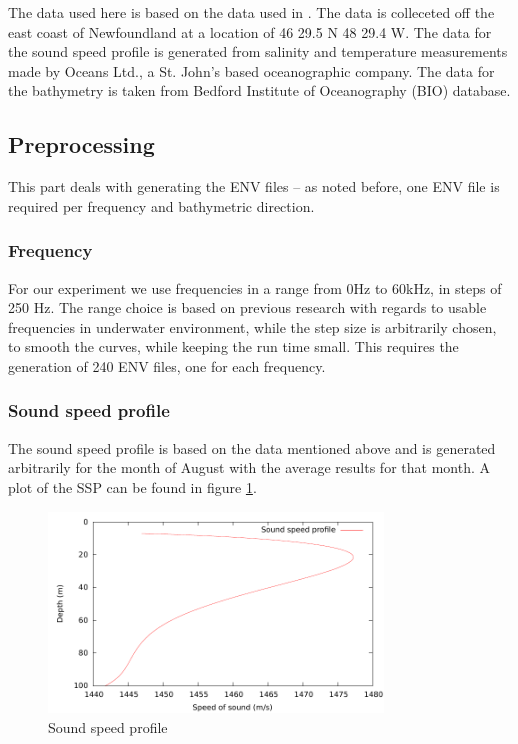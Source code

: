 \documentclass[a4paper]{IEEEtran}
\begin{document}
The data used here is based on the data used in \cite{book}. The data
is colleceted off the east coast of Newfoundland at a location of 46
29.5 N 48 29.4 W. The data for the sound speed profile is generated
from salinity and temperature measurements made by Oceans Ltd., a
St. John's based oceanographic company. The data for the bathymetry is
taken from Bedford Institute of Oceanography (BIO) database.

\subsection{Preprocessing}
This part deals with generating the ENV files -- as noted before, one
ENV file is required per frequency and bathymetric direction. 

\subsubsection{Frequency}
For our experiment we use frequencies in a range from 0Hz to 60kHz, in
steps of 250 Hz. The range choice is based on previous research with
regards to usable frequencies in underwater environment, while the
step size is arbitrarily chosen, to smooth the curves, while keeping
the run time small. This requires the generation of 240 ENV files, one
for each frequency.

\subsubsection{Sound speed profile}
The sound speed profile is based on the data mentioned above and is
generated arbitrarily for the month of August with the average results
for that month. A plot of the SSP can be found in figure \ref{fig:ssp}.
\begin{figure}[ht]
  \centering
  \includegraphics[width=3.5in]{../ssp.pdf}
  \caption{Sound speed profile}
  \label{fig:ssp}
\end{figure}
\end{document}
